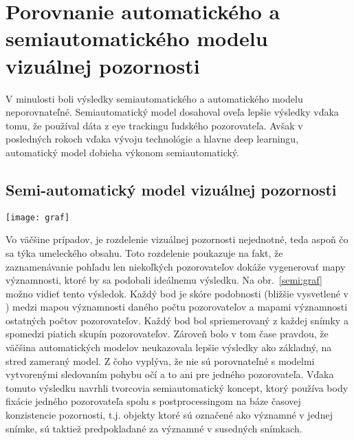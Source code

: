\documentclass[10pt,twoside,slovak,a4paper]{article}
\begin{document}
\section{Porovnanie automatického a semiautomatického modelu vizuálnej pozornosti} \label{porovnanie}
V minulosti boli výsledky semiautomatického a automatického modelu neporovnateľné. Semiautomatický model dosahoval oveľa lepšie výsledky vďaka tomu, že používal dáta z eye trackingu ľudského pozorovateľa. Avšak v posledných rokoch vďaka vývoju technológie a hlavne deep learningu, automatický model dobieha výkonom semiautomatický.

\subsection{Semi-automatický model vizuálnej pozornosti} \label{semi-auto}
\begin{figure*}[tbh]
\centering
\texttt{[image: graf]}
\caption{poukazuje na vzťah medzi počtom pozorovateľov a presnosťou máp významnosti. Obrázok prevzatý z \cite{Coplien:MPD}.}
\label{semi:graf}
\end{figure*}
Vo väčšine prípadov, je rozdelenie vizuálnej pozornosti nejednotné, teda aspoň čo sa týka umeleckého obsahu. Toto rozdelenie poukazuje na fakt, že zaznamenávanie pohľadu len niekoľkých pozorovateľov dokáže vygenerovať mapy významnosti, ktoré by sa podobali ideálnemu výsledku. Na obr.~\ref{semi:graf} možno vidieť tento výsledok. Každý bod je skóre podobnosti (bližšie vysvetlené v \cite{Azam2016:sim}) medzi mapou významnosti daného počtu pozorovateľov a mapami významnosti ostatných počtov pozorovateľov. Každý bod bol spriemerovaný z každej snímky a spomedzi piatich skupín pozorovateľov. Zároveň bolo v tom čase pravdou, že väčšina automatických modelov neukazovala lepšie výsledky ako základný, na stred zameraný model. Z čoho vyplýva, že nie sú porovnateľné s modelmi vytvorenými sledovaním pohybu očí a to ani pre jedného pozorovateľa. Vďaka tomuto výsledku navrhli tvorcovia\cite{Coplien:MPD} semiautomatický koncept, ktorý používa body fixácie jedného pozorovateľa spolu s postprocessingom na báze časovej konzistencie pozornosti, t.j. objekty ktoré sú označené ako významné v jednej snímke, sú taktiež predpokladané za významné v susedných snímkach.
\end{document}
